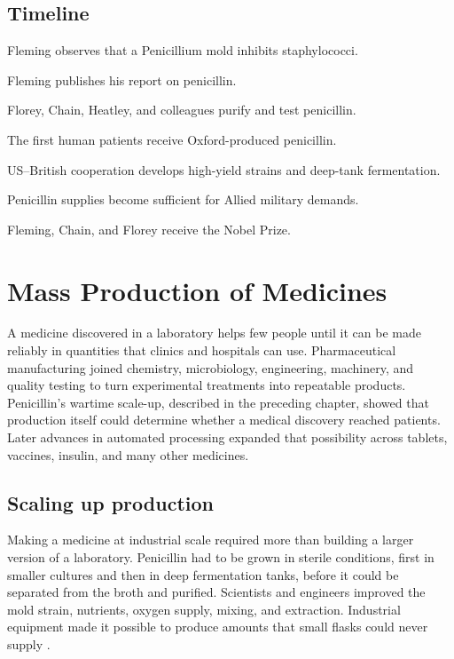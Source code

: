 \documentclass[12pt,oneside]{book}
\begin{document}
\section*{Timeline}
\begin{description}[leftmargin=2.3cm,style=nextline]
  \item[1928] Fleming observes that a Penicillium mold inhibits staphylococci.
  \item[1929] Fleming publishes his report on penicillin.
  \item[1939--1940] Florey, Chain, Heatley, and colleagues purify and test penicillin.
  \item[1941] The first human patients receive Oxford-produced penicillin.
  \item[1941--1943] US--British cooperation develops high-yield strains and deep-tank fermentation.
  \item[1943] Penicillin supplies become sufficient for Allied military demands.
  \item[1945] Fleming, Chain, and Florey receive the Nobel Prize.
\end{description}

\chapter[Mass Production of Medicines]{Mass Production of Medicines}

A medicine discovered in a laboratory helps few people until it can be made
reliably in quantities that clinics and hospitals can use. Pharmaceutical
manufacturing joined chemistry, microbiology, engineering, machinery, and
quality testing to turn experimental treatments into repeatable products.
Penicillin's wartime scale-up, described in the preceding chapter, showed
that production itself could determine whether a medical discovery reached
patients. Later advances in automated processing expanded that possibility
across tablets, vaccines, insulin, and many other medicines.

\section{Scaling up production}
Making a medicine at industrial scale required more than building a larger
version of a laboratory. Penicillin had to be grown in sterile conditions,
first in smaller cultures and then in deep fermentation tanks, before it
could be separated from the broth and purified. Scientists and engineers
improved the mold strain, nutrients, oxygen supply, mixing, and extraction.
Industrial equipment made it possible to produce amounts that small flasks
could never supply \cite{acsPenicillinManufacturing}.
\end{document}
